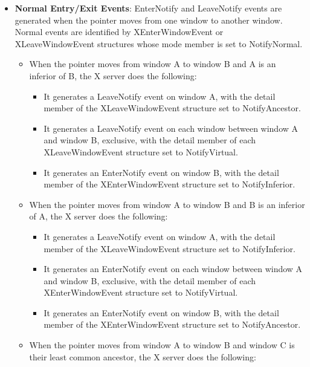 \documentclass{report}
\begin{document}
\begin{itemize}
        \item \textbf{Normal Entry/Exit Events}: EnterNotify and LeaveNotify events are generated when the pointer moves from one window to another window. Normal events are identified by XEnterWindowEvent or XLeaveWindowEvent structures whose mode member is set to NotifyNormal.
            \bigbreak \noindent 
            \begin{itemize}
                \item When the pointer moves from window A to window B and A is an inferior of B, the X server does the following:
                    \begin{itemize}
                        \item It generates a LeaveNotify event on window A, with the detail member of the XLeaveWindowEvent structure set to NotifyAncestor.
                        \item It generates a LeaveNotify event on each window between window A and window B, exclusive, with the detail member of each XLeaveWindowEvent structure set to NotifyVirtual.
                        \item It generates an EnterNotify event on window B, with the detail member of the XEnterWindowEvent structure set to NotifyInferior.
                    \end{itemize}
                \item When the pointer moves from window A to window B and B is an inferior of A, the X server does the following:
                    \begin{itemize}
                        \item It generates a LeaveNotify event on window A, with the detail member of the XLeaveWindowEvent structure set to NotifyInferior.
                        \item It generates an EnterNotify event on each window between window A and window B, exclusive, with the detail member of each XEnterWindowEvent structure set to NotifyVirtual.
                        \item It generates an EnterNotify event on window B, with the detail member of the XEnterWindowEvent structure set to NotifyAncestor.
                    \end{itemize}
                \item When the pointer moves from window A to window B and window C is their least common ancestor, the X server does the following:
                    \begin{itemize}

\end{itemize}
\end{itemize}
\end{itemize}
\end{document}
